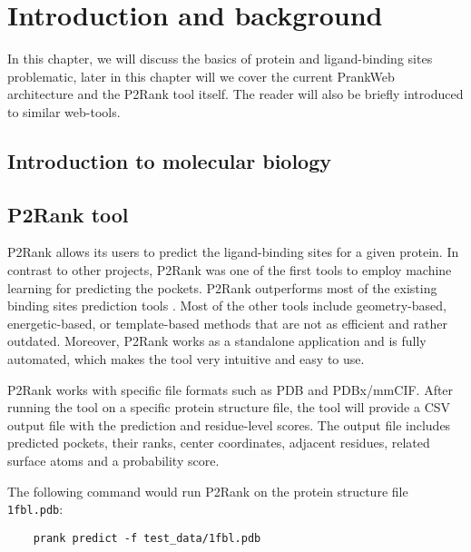 \chapter{Introduction and background}
\label{chap:refs}

In this chapter, we will discuss the basics of protein and ligand-binding sites problematic, later in this chapter will we cover the current PrankWeb architecture and the P2Rank tool itself. The reader will also be briefly introduced to similar web-tools.


\section{Introduction to molecular biology}


\section{P2Rank tool}

P2Rank allows its users to predict the ligand-binding sites for a given protein. In contrast to other projects, P2Rank was one of the first tools to employ machine learning for predicting the pockets. P2Rank outperforms most of the existing binding sites prediction tools \cite{krivak2018p2rank}. Most of the other tools include geometry-based, energetic-based, or template-based methods that are not as efficient and rather outdated. Moreover, P2Rank works as a standalone application and is fully automated, which makes the tool very intuitive and easy to use.

P2Rank works with specific file formats such as PDB and PDBx/mmCIF.  After running the tool on a specific protein structure file, the tool will provide a CSV output file with the prediction and residue-level scores. The output file includes predicted pockets, their ranks, center coordinates, adjacent residues, related surface atoms and a probability score.

The following command would run P2Rank on the protein structure file \texttt{1fbl.pdb}:

\begin{Verbatim}
    prank predict -f test_data/1fbl.pdb 
\end{Verbatim}

